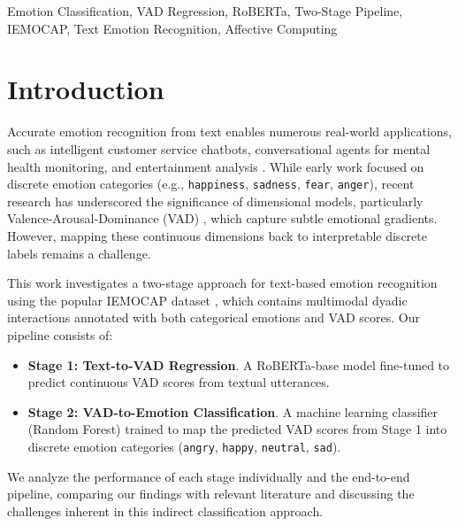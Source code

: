 \documentclass[conference]{IEEEtran}
\begin{document}
\begin{IEEEkeywords}
Emotion Classification, VAD Regression, RoBERTa, Two-Stage Pipeline, IEMOCAP, Text Emotion Recognition, Affective Computing
\end{IEEEkeywords}


\section{Introduction}
Accurate emotion recognition from text enables numerous real-world applications, such as intelligent customer service chatbots, conversational agents for mental health monitoring, and entertainment analysis \cite{mohammad2015emotion}. While early work focused on discrete emotion categories (e.g., \texttt{happiness}, \texttt{sadness}, \texttt{fear}, \texttt{anger}), recent research has underscored the significance of dimensional models, particularly Valence-Arousal-Dominance (VAD) \cite{mehrabian1995framework}, which capture subtle emotional gradients. However, mapping these continuous dimensions back to interpretable discrete labels remains a challenge.

This work investigates a two-stage approach for text-based emotion recognition using the popular IEMOCAP dataset \cite{busso2008iemocap}, which contains multimodal dyadic interactions annotated with both categorical emotions and VAD scores. Our pipeline consists of:
\begin{itemize}
    \item \textbf{Stage 1: Text-to-VAD Regression}. A RoBERTa-base model \cite{liu2019roberta} fine-tuned to predict continuous VAD scores from textual utterances.
    \item \textbf{Stage 2: VAD-to-Emotion Classification}. A machine learning classifier (Random Forest) trained to map the predicted VAD scores from Stage 1 into discrete emotion categories (\texttt{angry}, \texttt{happy}, \texttt{neutral}, \texttt{sad}).
\end{itemize}
We analyze the performance of each stage individually and the end-to-end pipeline, comparing our findings with relevant literature and discussing the challenges inherent in this indirect classification approach.
\end{document}
